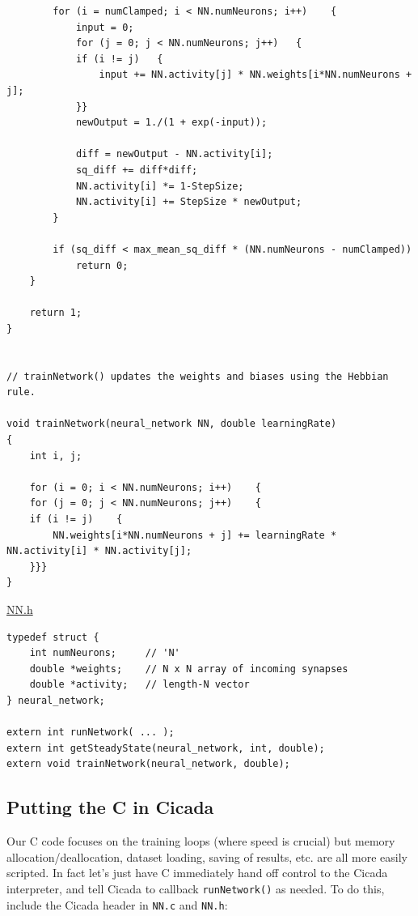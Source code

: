 \documentclass{article}
\newenvironment{longcode}{
       \begin{list}{}{
               \setlength{\leftmargin}{0in}
               \setlength{\rightmargin}{0in}
               \setlength{\topsep}{.2in}
       }
       \small
       \item[] }
       { \end{list}   }
\begin{document}
\begin{longcode}
\begin{verbatim}
        for (i = numClamped; i < NN.numNeurons; i++)	{
            input = 0;
            for (j = 0; j < NN.numNeurons; j++)   {
            if (i != j)   {
                input += NN.activity[j] * NN.weights[i*NN.numNeurons + j];
            }}
            newOutput = 1./(1 + exp(-input));
            
            diff = newOutput - NN.activity[i];
            sq_diff += diff*diff;
            NN.activity[i] *= 1-StepSize;
            NN.activity[i] += StepSize * newOutput;
        }
        
        if (sq_diff < max_mean_sq_diff * (NN.numNeurons - numClamped))
            return 0;
    }
    
    return 1;
}


// trainNetwork() updates the weights and biases using the Hebbian rule.

void trainNetwork(neural_network NN, double learningRate)
{
    int i, j;
    
    for (i = 0; i < NN.numNeurons; i++)    {
    for (j = 0; j < NN.numNeurons; j++)    {
    if (i != j)    {
        NN.weights[i*NN.numNeurons + j] += learningRate * NN.activity[i] * NN.activity[j];
    }}}
}
\end{verbatim} \end{longcode}

\noindent \underline{NN.h}

\begin{longcode} \begin{verbatim}
typedef struct {
    int numNeurons;     // 'N'
    double *weights;    // N x N array of incoming synapses
    double *activity;   // length-N vector
} neural_network;

extern int runNetwork( ... );
extern int getSteadyState(neural_network, int, double);
extern void trainNetwork(neural_network, double);
\end{verbatim} \end{longcode}



\subsection{Putting the C in Cicada}

Our C code focuses on the training loops (where speed is crucial) but memory allocation/deallocation, dataset loading, saving of results, etc. are all more easily scripted.  In fact let's just have C immediately hand off control to the Cicada interpreter, and tell Cicada to callback \verb#runNetwork()# as needed.  To do this, include the Cicada header in \verb#NN.c# and \verb#NN.h#:
\end{document}
